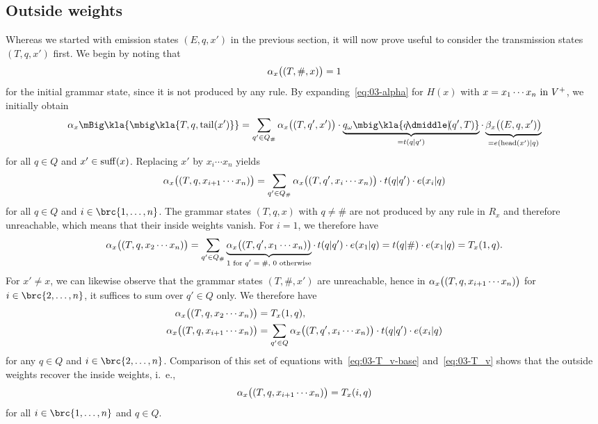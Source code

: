 \subsection{Outside weights}

Whereas we started with emission states $(E,q,x')$ in the previous section, it
will now prove useful to consider the transmission states $(T,q,x')$ first. We
begin by noting that
\[
 \alpha_x\bigl((T,\#,x)\bigr) = 1
\]
for the initial grammar state, since it is not produced by any rule. By expanding~\eqref{eq:03-alpha} for $H(x)$ with $x=x_1\cdots x_n\text{ in } V^+$, we initially obtain
\[
 \alpha_x\mBig\kla{\mbig\kla{T,q,\cdr(x')}} = \sum_{q'\in Q_\#} \alpha_x\doublekla{T,q',x'} \cdot \underbrace{q_\omega\mbig\kla{q\npipe(q',T)}}_{=t(q|q')} \cdot \underbrace{\beta_x\doublekla{E,q,x'}}_{=e(\car(x')|q)}
\]
for all $q\in Q$ and $x'\in\operatorname{suff}(x)$. Replacing $x'$ by $x_i\cdots x_n$ yields
\[
 \alpha_x\bigl((T,q,x_{i+1}\cdots x_n)\bigr) = \sum_{q'\in Q_\#} \alpha_x\bigl((T,q',x_i\cdots x_n)\bigr) \cdot t(q|q') \cdot e(x_i|q)
\]
for all $q\in Q$ and $i\in\brc{1,\ldots,n}$. The grammar states $(T,q,x)$ with $q\neq\#$ are not produced by any rule in $R_x$ and therefore unreachable, which means that their inside weights vanish. For $i=1$, we therefore have
\[
 \alpha_x\bigl((T,q,x_2\cdots x_n)\bigr) = \sum_{q'\in Q_\#} \underbrace{\alpha_x\bigl((T,q',x_1\cdots x_n)\bigr)}_{\text{$1$ for $q'=\#$, $0$ otherwise}} \cdot\, t(q|q') \cdot e(x_1|q)
 = t(q|\#) \cdot e(x_1|q) = T_x(1,q).
\]
For $x'\neq x$, we can likewise observe that the grammar states $(T,\#,x')$ are
unreachable, hence in $\alpha_x\bigl((T,q,x_{i+1}\cdots x_n)\bigr)$ for
$i\in\brc{2,\ldots,n}$, it suffices to sum over $q'\in Q$ only. We therefore have
\begin{align*}
 \alpha_x\bigl((T,q,x_2\cdots x_n)\bigr) &= T_x(1,q), \\
 \alpha_x\bigl((T,q,x_{i+1}\cdots x_n)\bigr) &= \sum_{q'\in Q} \alpha_x\bigl((T,q',x_i\cdots x_n)\bigr) \cdot t(q|q') \cdot e(x_i|q)
\end{align*}
for any $q\in Q$ and $i\in\brc{2,\ldots,n}$. Comparison of this set of equations with~\eqref{eq:03-T_v-base} and~\eqref{eq:03-T_v} shows that the outside weights recover the inside weights, i.~e.,
\[
 \alpha_x\bigl((T,q,x_{i+1}\cdots x_n)\bigr) = T_x(i,q)
\]
for all $i\in\brc{1,\ldots,n}$ and $q\in Q$.

